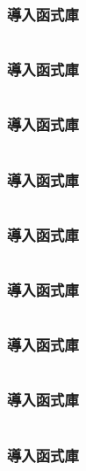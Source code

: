 			
			
		\subsubsection{導入函式庫}
			\begin{lstlisting}[language=C]
			\end{lstlisting}
			
			
			
			
		\subsubsection{導入函式庫}
			\begin{lstlisting}[language=C]
			\end{lstlisting}
			
			
			
		\subsubsection{導入函式庫}
			\begin{lstlisting}[language=C]
			\end{lstlisting}
			
			
			
		\subsubsection{導入函式庫}
			\begin{lstlisting}[language=C]
			\end{lstlisting}
			
			
		\subsubsection{導入函式庫}
			\begin{lstlisting}[language=C]
			\end{lstlisting}
			
			
			
		\subsubsection{導入函式庫}
			\begin{lstlisting}[language=C]
			\end{lstlisting}
		\subsubsection{導入函式庫}
			\begin{lstlisting}[language=C]
			\end{lstlisting}
		\subsubsection{導入函式庫}
			\begin{lstlisting}[language=C]
			\end{lstlisting}
			
		\subsubsection{導入函式庫}
			\begin{lstlisting}[language=C]
			\end{lstlisting}